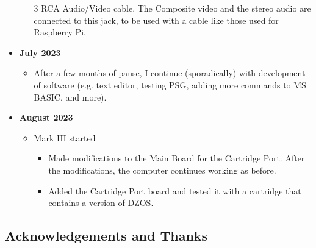 \documentclass[a4paper,11pt]{article}
\begin{document}
\begin{itemize}
\begin{itemize}
            3 RCA Audio/Video cable. The Composite video and the stereo audio
            are connected to this jack, to be used with a cable like those used
            for  Raspberry Pi.
        \end{itemize}
        \item \textbf{July 2023}
        \begin{itemize}
            \item After a few months of pause, I continue (sporadically) with
            development of software (e.g. text editor, testing PSG, adding more
            commands to MS BASIC, and more).
        \end{itemize}
        \item \textbf{August 2023}
        \begin{itemize}
            \item Mark III started
            \begin{itemize}
                \item Made modifications to the Main Board for the Cartridge
                Port. After the modifications, the computer continues working as
                before.
                \item Added the Cartridge Port board and tested it with a
                cartridge that contains a version of DZOS.
            \end{itemize}
        \end{itemize}
    \end{itemize}

    \subsection{Acknowledgements and Thanks}
\end{document}
